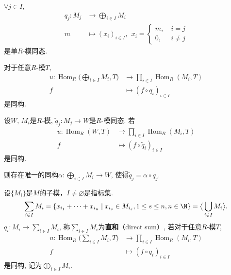 	\begin{definition}
		$\forall j\in I$,
		\begin{align*}
		q_j:M_j&\rightarrow \bigoplus\limits_{i\in I} M_i\\
		m&\mapsto (x_i)_{i\in I},\ \ x_i=\begin{cases} m,\ &i=j\\ 0,\ &i\neq j \end{cases}
		\end{align*}是单$R$-模同态.
	
	\end{definition}
	
	\begin{proposition}
	对于任意$R$-模$T$,
		\begin{align*}
			u:\operatorname{Hom}_R\Big(\bigoplus\limits_{i\in I} M_i,T\Big) &\rightarrow \prod\limits_{i\in I} \operatorname{Hom}_R(M_i,T)\\
			f &\mapsto (f\circ q_i)_{i\in I}
		\end{align*}
	是同构.
	\end{proposition}

    \begin{proposition}
        设$W$, $M_i$是$R$-模, $\tilde{q}_j:M_j \rightarrow W$是$R$-模同态. 若
        \begin{align*}
			u:\operatorname{Hom}_R(W,T) &\rightarrow \prod\limits_{i\in I} \operatorname{Hom}_R(M_i,T)\\
			f &\mapsto (f\circ \tilde{q}_i)_{i\in I}
		\end{align*}
    是同构.\par
        \qquad 则存在唯一的同构$\alpha: \bigoplus\limits_{i\in I} M_i \rightarrow W$, 使得$\tilde{q}_j=\alpha\circ q_j$.


    \end{proposition}

	
	
	\begin{definition}
		设$\{M_i\}$是$M$的子模，$I\neq \varnothing$是指标集.
		$$\sum_{i\in I} M_i=\{x_{i_1}+\cdots +x_{i_n}\mid x_{i_s}\in M_{i_s}, 
        1\leq s\leq n, n\in \N\}=\big\langle\bigcup_{i\in I} M_i\big\rangle.$$
        $q_i:M_i\rightarrow \sum\limits_{i\in I} M_i$, 
        称$\sum\limits_{i\in I} M_i$为\textbf{直和}（direct sum）, 若对于任意$R$-模$T$, 
			\begin{align*}
			u:\operatorname{Hom}_R\Big(\sum\limits_{i\in I} M_i,T\Big) &\rightarrow \prod\limits_{i\in I} \operatorname{Hom}_R(M_i,T)\\
			f &\mapsto (f\circ q_i)_{i\in I}
		\end{align*}
	是同构, 记为$\bigoplus\limits_{i\in I} M_i$.
	\end{definition}
	
